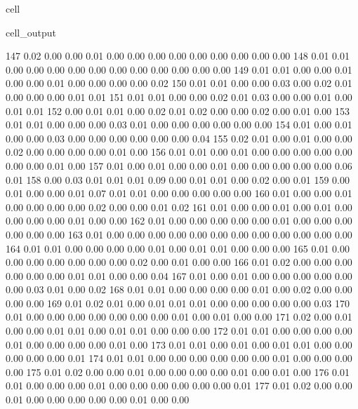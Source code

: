 \documentclass[letterpaper,10pt,english]{jupyterBook}
\begin{document}
\begin{sphinxuseclass}{cell}
\begin{sphinxVerbatimOutput}
\begin{sphinxuseclass}{cell_output}
\begin{sphinxVerbatim}[commandchars=\\\{\}]
       147	0.02 	0.00 	0.00 	0.01 	0.00 	0.00 	0.00 	0.00 	0.00 	0.00 	0.00 	0.00 	0.00
       148	0.01 	0.01 	0.00 	0.00 	0.00 	0.00 	0.00 	0.00 	0.00 	0.00 	0.00 	0.00 	0.00
       149	0.01 	0.01 	0.00 	0.00 	0.01 	0.00 	0.00 	0.01 	0.00 	0.00 	0.00 	0.00 	0.02
       150	0.01 	0.01 	0.00 	0.00 	0.03 	0.00 	0.02 	0.01 	0.00 	0.00 	0.00 	0.01 	0.01
       151	0.01 	0.01 	0.00 	0.00 	0.02 	0.01 	0.03 	0.00 	0.00 	0.01 	0.00 	0.01 	0.01
       152	0.00 	0.01 	0.01 	0.00 	0.02 	0.01 	0.02 	0.00 	0.00 	0.02 	0.00 	0.01 	0.00
       153	0.01 	0.01 	0.00 	0.00 	0.00 	0.03 	0.01 	0.00 	0.00 	0.00 	0.00 	0.00 	0.00
       154	0.01 	0.00 	0.01 	0.00 	0.00 	0.03 	0.00 	0.00 	0.00 	0.00 	0.00 	0.00 	0.04
       155	0.02 	0.01 	0.00 	0.01 	0.00 	0.00 	0.02 	0.00 	0.00 	0.00 	0.00 	0.01 	0.00
       156	0.01 	0.01 	0.00 	0.01 	0.00 	0.00 	0.00 	0.00 	0.00 	0.00 	0.00 	0.01 	0.00
       157	0.01 	0.00 	0.01 	0.00 	0.00 	0.01 	0.00 	0.00 	0.00 	0.00 	0.00 	0.06 	0.01
       158	0.00 	0.03 	0.01 	0.01 	0.01 	0.09 	0.00 	0.01 	0.01 	0.00 	0.02 	0.00 	0.01
       159	0.00 	0.01 	0.00 	0.00 	0.01 	0.07 	0.01 	0.01 	0.00 	0.00 	0.00 	0.00 	0.00
       160	0.01 	0.00 	0.00 	0.01 	0.00 	0.00 	0.00 	0.00 	0.02 	0.00 	0.00 	0.01 	0.02
       161	0.01 	0.00 	0.00 	0.01 	0.00 	0.01 	0.00 	0.00 	0.00 	0.00 	0.01 	0.00 	0.00
       162	0.01 	0.00 	0.00 	0.00 	0.00 	0.00 	0.01 	0.00 	0.00 	0.00 	0.00 	0.00 	0.00
       163	0.01 	0.00 	0.00 	0.00 	0.00 	0.00 	0.00 	0.00 	0.00 	0.00 	0.00 	0.00 	0.00
       164	0.01 	0.01 	0.00 	0.00 	0.00 	0.00 	0.01 	0.00 	0.01 	0.01 	0.00 	0.00 	0.00
       165	0.01 	0.00 	0.00 	0.00 	0.00 	0.00 	0.00 	0.00 	0.02 	0.00 	0.01 	0.00 	0.00
       166	0.01 	0.02 	0.00 	0.00 	0.00 	0.00 	0.00 	0.00 	0.01 	0.01 	0.00 	0.00 	0.04
       167	0.01 	0.00 	0.01 	0.00 	0.00 	0.00 	0.00 	0.00 	0.00 	0.03 	0.01 	0.00 	0.02
       168	0.01 	0.01 	0.00 	0.00 	0.00 	0.00 	0.01 	0.00 	0.02 	0.00 	0.00 	0.00 	0.00
       169	0.01 	0.02 	0.01 	0.00 	0.01 	0.01 	0.01 	0.00 	0.00 	0.00 	0.00 	0.00 	0.03
       170	0.01 	0.00 	0.00 	0.00 	0.00 	0.00 	0.00 	0.00 	0.01 	0.00 	0.01 	0.00 	0.00
       171	0.02 	0.00 	0.01 	0.00 	0.00 	0.01 	0.01 	0.00 	0.01 	0.01 	0.00 	0.00 	0.00
       172	0.01 	0.01 	0.00 	0.00 	0.00 	0.00 	0.01 	0.00 	0.00 	0.00 	0.00 	0.01 	0.00
       173	0.01 	0.01 	0.00 	0.01 	0.00 	0.01 	0.01 	0.00 	0.00 	0.00 	0.00 	0.00 	0.01
       174	0.01 	0.01 	0.00 	0.00 	0.00 	0.00 	0.00 	0.00 	0.01 	0.00 	0.00 	0.00 	0.00
       175	0.01 	0.02 	0.00 	0.00 	0.01 	0.00 	0.00 	0.00 	0.00 	0.01 	0.00 	0.01 	0.00
       176	0.01 	0.01 	0.00 	0.00 	0.00 	0.01 	0.00 	0.00 	0.00 	0.00 	0.00 	0.00 	0.01
       177	0.01 	0.02 	0.00 	0.00 	0.01 	0.00 	0.00 	0.00 	0.00 	0.00 	0.01 	0.00 	0.00
\end{sphinxVerbatim}

\end{sphinxuseclass}\end{sphinxVerbatimOutput}

\end{sphinxuseclass}
\end{document}
